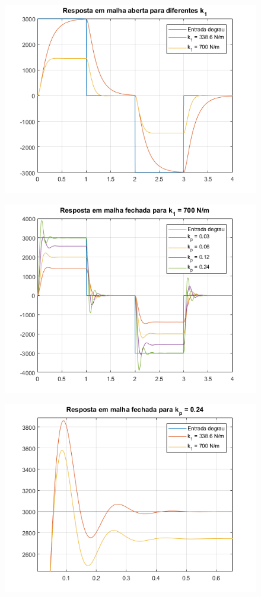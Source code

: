 \documentclass[a4paper,11pt]{article}
\begin{document}
\begin{figure}[H]
\includegraphics{exp01e12-aberta}
\centering
\end{figure}

\begin{figure}[H]
\includegraphics{exp01e12-fechada}
\centering
\end{figure}

\begin{figure}[H]
\includegraphics{exp01e12-fechada-zoom}
\centering
\end{figure}
\end{document}
